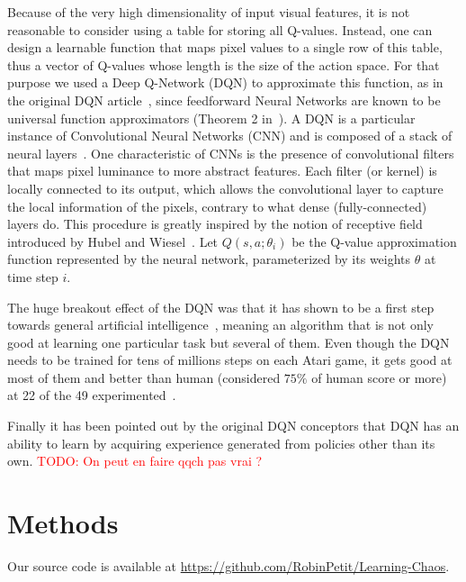 \documentclass[letterpaper]{article}
\newcommand\todo[1]{\textcolor{red}{TODO: #1}}
\begin{document}
Because of the very high dimensionality of input visual features, it is not reasonable to consider using a table for storing all Q-values.
Instead, one can design a learnable function that maps pixel values to a single row of this table, thus a vector of Q-values whose length is the size
of the action space. For that purpose we used a Deep Q-Network (DQN) to approximate this function, as in the original DQN article~\citep{mnih2015human}, since feedforward Neural Networks
are known to be universal function approximators (Theorem 2 in~\cite{hornik1991approximation}).
A DQN is a particular instance of Convolutional Neural Networks (CNN) and is composed of a stack of neural layers~\citep{lecun1998gradient}. One characteristic of CNNs is the
presence of convolutional filters that maps pixel luminance to more abstract features. Each filter (or kernel) is locally connected to its output, which
allows the convolutional layer to capture the local information of the pixels, contrary to what dense (fully-connected) layers do. This procedure is greatly
inspired by the notion of receptive field introduced by Hubel and Wiesel~\citep{Hubel1962}.
Let $Q(s, a; \theta_i)$ be the Q-value approximation function represented by the neural network, parameterized by its weights $\theta$ at time step $i$.

The huge breakout effect of the DQN was that it has shown to be a first step towards general artificial intelligence~\citep{togelius2015ai}, meaning an
algorithm that is not only good at learning one particular task but several of them. Even though the DQN needs to be trained for tens of millions steps
on each Atari game, it gets good at most of them and better than human (considered $75\%$ of human score or more) at 22 of the 49 experimented~\citep{mnih2015human}.

Finally it has been pointed out by the original DQN conceptors that DQN has an ability to learn by acquiring experience generated from policies
other than its own. \todo{On peut en faire qqch pas vrai ?}

\section{Methods}

Our source code is available at \url{https://github.com/RobinPetit/Learning-Chaos}.
\end{document}
